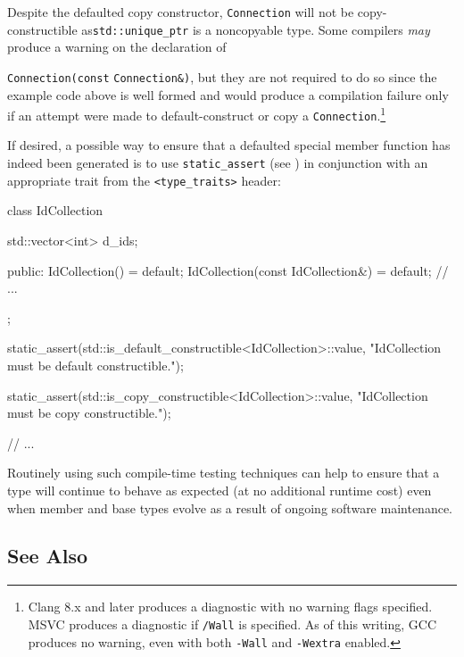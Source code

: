 \noindent Despite the defaulted copy constructor, \lstinline!Connection! will not be
copy-constructible as\linebreak[4] \lstinline!std::unique_ptr! is a noncopyable type.
Some compilers \emph{may} produce a warning on the declaration of
{\lstinline!Connection(const! \lstinline!Connection&)!, but they are not
required to do so since the example code above is well formed and would produce a
compilation failure only if an attempt were made to default-construct or
copy a \lstinline!Connection!.{\cprotect\footnote{Clang 8.x 
and later produces a diagnostic with no warning flags specified.
MSVC produces a diagnostic if \lstinline!/Wall! is specified. As of this writing, GCC produces no warning, even with both
  \lstinline!-Wall! and \lstinline!-Wextra! enabled.}}

If desired, a possible way to ensure that a defaulted special member
function has indeed been generated is to use
{\lstinline!static_assert!} (see ) 
in conjunction with an
appropriate trait from the \lstinline!<type_traits>! header:

\begin{emcppslisting}[language=C++]
class IdCollection
{
    std::vector<int> d_ids;

public:
    IdCollection() = default;
    IdCollection(const IdCollection&) = default;
    // ...
};

static_assert(std::is_default_constructible<IdCollection>::value,
              "IdCollection must be default constructible.");

static_assert(std::is_copy_constructible<IdCollection>::value,
              "IdCollection must be copy constructible.");

// ...
\end{emcppslisting}
    
\noindent Routinely using such compile-time testing techniques can help to ensure
that a type will continue to behave as expected (at no additional
runtime cost) even when member and base types evolve as a result
of ongoing software maintenance.

\subsection[See Also]{See Also}\label{see-also}

}
